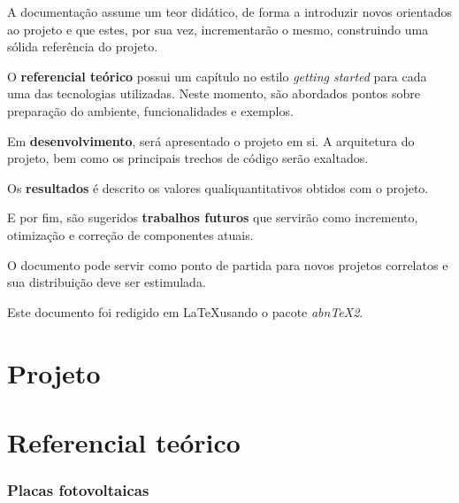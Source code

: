 \documentclass[
12pt,				%
openany,			%
twoside,			%
a4paper,			%
english,			%
french,				%
spanish,			%
brazil,				%
]{abntex2}
\begin{document}
A documentação assume um teor didático, de forma a introduzir novos
orientados ao projeto e que estes, por sua vez, incrementarão o mesmo, 
construindo uma sólida referência do projeto.

O \textbf{referencial teórico} possui um capítulo no estilo \textit{getting started} para cada uma das tecnologias utilizadas. Neste momento, são abordados pontos sobre preparação do ambiente, funcionalidades e exemplos.

Em \textbf{desenvolvimento}, será apresentado o projeto em si. A arquitetura do projeto, bem como os principais trechos de código serão exaltados. 

Os \textbf{resultados} é descrito os valores qualiquantitativos obtidos com o projeto.

E por fim, são sugeridos \textbf{trabalhos futuros} que servirão como incremento, otimização e correção de componentes atuais.

O documento pode servir como ponto de partida para novos projetos correlatos
e sua distribuição deve ser estimulada.

Este documento foi redigido em \LaTeX usando o pacote \textit{abnTeX2}.
\part{Projeto}

\part{Referencial teórico}


%

\section{Placas fotovoltaicas}
\end{document}
